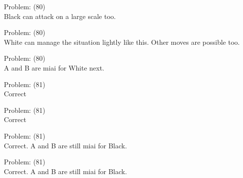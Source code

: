 \documentclass[11pt]{article}
\begin{document}
\begin{minipage}[t]{0.5\textwidth}
  {\centering
  
  Problem: (80)\\
  Black can attack on a large scale too.\\
  }
\end{minipage}
\begin{minipage}[t]{0.5\textwidth}
  {\centering
  
  Problem: (80)\\
  White can manage the situation lightly like this. Other moves are possible too.\\
  }
\end{minipage}
\begin{minipage}[t]{0.5\textwidth}
  {\centering
  
  Problem: (80)\\
  A and B are miai for White next.\\
  }
\end{minipage}
\begin{minipage}[t]{0.5\textwidth}
  {\centering
  
  Problem: (81)\\
  Correct\\
  }
\end{minipage}
\begin{minipage}[t]{0.5\textwidth}
  {\centering
  
  Problem: (81)\\
  Correct\\
  }
\end{minipage}
\begin{minipage}[t]{0.5\textwidth}
  {\centering
  
  Problem: (81)\\
  Correct. A and B are still miai for Black.\\
  }
\end{minipage}
\begin{minipage}[t]{0.5\textwidth}
  {\centering
  
  Problem: (81)\\
  Correct. A and B are still miai for Black.\\
  }
\end{minipage}
\end{document}
